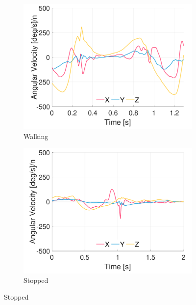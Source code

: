 \begin{figure}[p]
\centering
    \begin{subfigure}[b]{0.49\textwidth}
         \centering
         \includegraphics[width=\textwidth]{content/3-Methods/example-data/ch3_example_data_subject_01_r_ankle_gyro_activity_walking.pdf}
         \caption{Walking}
    \end{subfigure}
    \begin{subfigure}[b]{0.49\textwidth}
         \centering
         \includegraphics[width=\textwidth]{content/3-Methods/example-data/ch3_example_data_subject_01_r_ankle_gyro_activity_stop.pdf}
         \caption{Stopped}
    \end{subfigure}
    

\end{figure}
